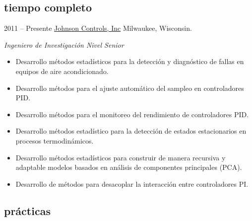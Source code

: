 \documentclass[]{friggeri-cv} %
\begin{document}
\subsection{tiempo completo}

\begin{entrylist}


\entry
{2011 -- Presente}
{\href{http://www.johnsoncontrols.com}{Johnson Controls, Inc}}
{Milwaukee, Wisconsin.}
{
\emph{Ingeniero de Investigación Nivel Senior}
\begin{itemize}
	\item Desarrollo métodos estadísticos para la detección y diagnóstico de fallas en equipos de aire acondicionado.
	\item Desarrollo métodos para el ajuste automático del sampleo en controladores PID.
	\item Desarrollo métodos para el monitoreo del rendimiento de controladores PID.
	\item Desarrollo métodos estadístico para la detección de estados estacionarios en procesos termodinámicos.
	\item Desarrollo métodos estadísticos para construir de manera recursiva y adaptable modelos basados en análisis de componentes principales (PCA).
	\item Desarrollo de métodos para desacoplar la interacción entre controladores PI.
\end{itemize}
}

\end{entrylist}

\newpage

\subsection{prácticas}
\end{document}
